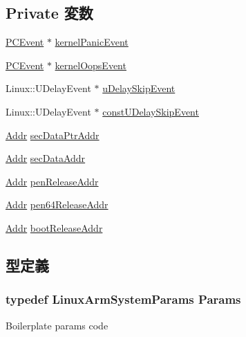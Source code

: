 \subsection*{Private 変数}
\begin{DoxyCompactItemize}
\item 
\hyperlink{classPCEvent}{PCEvent} $\ast$ \hyperlink{classLinuxArmSystem_a06483304d3fd0e7aa71e46d602fd8fca}{kernelPanicEvent}
\item 
\hyperlink{classPCEvent}{PCEvent} $\ast$ \hyperlink{classLinuxArmSystem_a34ff17256dac7f50230fa2647f283d8b}{kernelOopsEvent}
\item 
Linux::UDelayEvent $\ast$ \hyperlink{classLinuxArmSystem_a556c0b2adbf4b92eb5105b222ce79e55}{uDelaySkipEvent}
\item 
Linux::UDelayEvent $\ast$ \hyperlink{classLinuxArmSystem_a4f8baa07addc116cd3bbca7ced7ed334}{constUDelaySkipEvent}
\item 
\hyperlink{base_2types_8hh_af1bb03d6a4ee096394a6749f0a169232}{Addr} \hyperlink{classLinuxArmSystem_adfcef8a6e43803757c1e941c5005ad36}{secDataPtrAddr}
\item 
\hyperlink{base_2types_8hh_af1bb03d6a4ee096394a6749f0a169232}{Addr} \hyperlink{classLinuxArmSystem_a6c059b006ceb752c5e6b2e1d90b54e33}{secDataAddr}
\item 
\hyperlink{base_2types_8hh_af1bb03d6a4ee096394a6749f0a169232}{Addr} \hyperlink{classLinuxArmSystem_a38de836fdda5d23ffd25ffbd1a1faa74}{penReleaseAddr}
\item 
\hyperlink{base_2types_8hh_af1bb03d6a4ee096394a6749f0a169232}{Addr} \hyperlink{classLinuxArmSystem_a013c7886af50b6686a3146af9a3ea898}{pen64ReleaseAddr}
\item 
\hyperlink{base_2types_8hh_af1bb03d6a4ee096394a6749f0a169232}{Addr} \hyperlink{classLinuxArmSystem_ab9398c8331a3a3619bf16596eb81c1dc}{bootReleaseAddr}
\end{DoxyCompactItemize}


\subsection{型定義}
\hypertarget{classLinuxArmSystem_ae0ebf28024a7bb607cc65e59c8faa9d5}{
\subsubsection[{Params}]{\setlength{\rightskip}{0pt plus 5cm}typedef LinuxArmSystemParams {\bf Params}}}
\label{classLinuxArmSystem_ae0ebf28024a7bb607cc65e59c8faa9d5}
Boilerplate params code 


